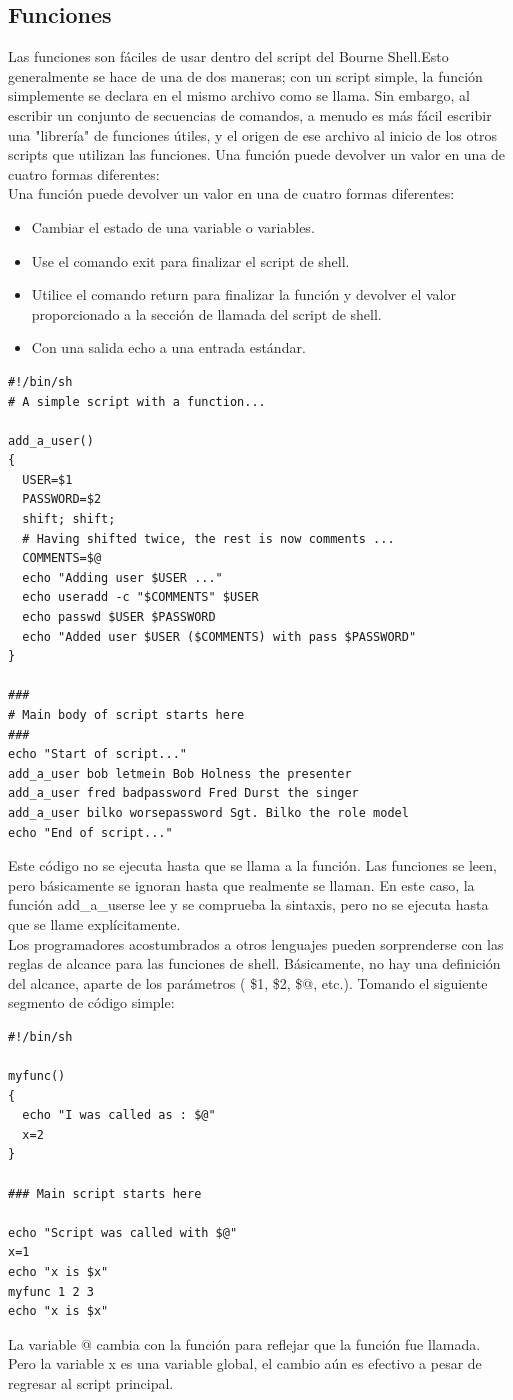 \documentclass[12pt]{article}
\begin{document}
\subsection*{Funciones}
Las funciones son fáciles de usar dentro del script del Bourne Shell.Esto generalmente se hace de una de dos maneras; con un script simple, la función simplemente se declara en el mismo archivo como se llama. Sin embargo, al escribir un conjunto de secuencias de comandos, a menudo es más fácil escribir una "librería" de funciones útiles, y el origen de ese archivo al inicio de los otros scripts que utilizan las funciones. Una función puede devolver un valor en una de cuatro formas diferentes:\\
Una función puede devolver un valor en una de cuatro formas diferentes:
\begin{itemize}
\item Cambiar el estado de una variable o variables.
\item Use el comando exit para finalizar el script de shell.
\item Utilice el comando return para finalizar la función y devolver el valor proporcionado a la sección de llamada del script de shell.
\item Con una salida echo a una entrada estándar.
\end{itemize}
\begin{verbatim}
#!/bin/sh
# A simple script with a function...

add_a_user()
{
  USER=$1
  PASSWORD=$2
  shift; shift;
  # Having shifted twice, the rest is now comments ...
  COMMENTS=$@
  echo "Adding user $USER ..."
  echo useradd -c "$COMMENTS" $USER
  echo passwd $USER $PASSWORD
  echo "Added user $USER ($COMMENTS) with pass $PASSWORD"
}

###
# Main body of script starts here
###
echo "Start of script..."
add_a_user bob letmein Bob Holness the presenter
add_a_user fred badpassword Fred Durst the singer
add_a_user bilko worsepassword Sgt. Bilko the role model
echo "End of script..."
\end{verbatim}
Este código no se ejecuta hasta que se llama a la función. Las funciones se leen, pero básicamente se ignoran hasta que realmente se llaman. En este caso, la función add\_a\_userse lee y se comprueba la sintaxis, pero no se ejecuta hasta que se llame explícitamente.\\

Los programadores acostumbrados a otros lenguajes pueden sorprenderse con las reglas de alcance para las funciones de shell. Básicamente, no hay una definición del alcance, aparte de los parámetros ( \$1, \$2, \$@, etc.). Tomando el siguiente segmento de código simple:
\begin{verbatim}
#!/bin/sh

myfunc()
{
  echo "I was called as : $@"
  x=2
}

### Main script starts here 

echo "Script was called with $@"
x=1
echo "x is $x"
myfunc 1 2 3
echo "x is $x"
\end{verbatim}
La variable @ cambia con la función para reflejar que la función fue llamada. Pero la
variable x es una variable global, el cambio aún es efectivo a pesar de regresar al script principal.
\end{document}
